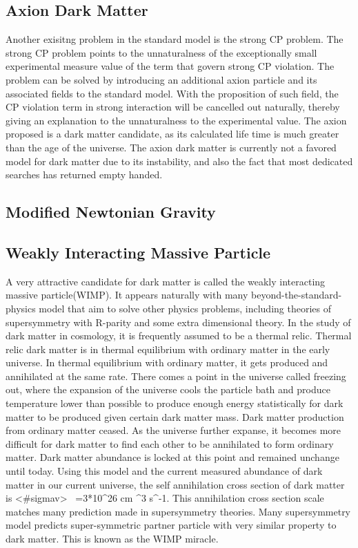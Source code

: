 
\subsection{Axion Dark Matter}
Another exisitng problem in the standard model is the strong CP problem. The strong CP problem points to the unnaturalness of the exceptionally small experimental measure value of the term that govern strong CP violation. 
The problem can be solved by introducing an additional axion particle and its associated fields to the standard model. With the proposition of such field, the CP violation term in strong interaction will be cancelled out naturally, thereby giving an explanation to the unnaturalness to the experimental value. 
The axion proposed is a dark matter candidate, as its calculated life time is much greater than the age of the universe. 
The axion dark matter is currently not a favored model for dark matter due to its instability, and also the fact that most dedicated searches has returned empty handed. 


\subsection{Modified Newtonian Gravity}

\subsection{Weakly Interacting Massive Particle}
A very attractive candidate for dark matter is called the weakly interacting massive particle(WIMP). It appears naturally with many beyond-the-standard-physics model that aim to solve other physics problems, including theories of supersymmetry with R-parity and some extra dimensional theory. 
In the study of dark matter in cosmology, it is frequently assumed to be a thermal relic. Thermal relic dark matter is in thermal equilibrium with ordinary matter in the early universe. In thermal equilibrium with ordinary matter, it gets produced and annihilated at the same rate. There comes a point in the universe called freezing out, where the expansion of the universe cools the particle bath and produce temperature lower than possible to produce enough energy statistically for dark matter to
be produced given certain dark matter mass. Dark matter production from ordinary matter ceased. As the universe further expanse, it becomes more difficult for dark matter to find each other to be annihilated to form ordinary matter. Dark matter abundance is locked at this point and remained unchange until today. 
Using this model and the current measured abundance of dark matter in our current universe, the self annihilation cross section of dark matter is <#{sigma}v> ~=3*10^26 cm ^3 s^-1. This annihilation cross section scale matches many prediction made in supersymmetry theories. Many supersymmetry model predicts super-symmetric partner particle with very similar property to dark matter. This is known as the WIMP miracle. 


